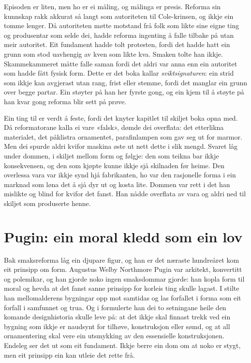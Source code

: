 Episoden er liten, men ho er ei måling, og målinga er presis. Reforma sin kunnskap rakk akkurat så langt som autoriteten til Cole-krinsen, og ikkje ein tomme lenger. Då autoriteten møtte motstand frå folk som likte sine eigne ting og produsentar som selde dei, hadde reforma ingenting å falle tilbake på utan meir autoritet. Eit fundament hadde tolt protesten, fordi det hadde hatt ein grunn som stod uavhengig av kven som likte kva. Smaken tolte han ikkje. Skammekammeret måtte falle saman fordi det aldri var anna enn ein autoritet som hadde fått fysisk form. Dette er det boka kallar \emph{sviktsignaturen}: ein strid som ikkje kan avgjerast utan rang, frist eller stemme, fordi det manglar ein grunn over begge partar. Ein støyter på han her fyrste gong, og ein kjem til å støyte på han kvar gong reforma blir sett på prøve.

Ein ting til er verdt å feste, fordi det knyter kapitlet til skiljet boka opna med. Då reformatorane kalla ei vare «falsk», dømde dei overflata: det etterlikna materialet, det påklistra ornamentet, parafinlampen som gav seg ut for marmor. Men dei spurde aldri kvifor maskina øste ut nett dette i slik mengd. Svaret låg under dommen, i skiljet mellom form og følgje: den som teikna bar ikkje konsekvensen, og den som kjøpte kunne ikkje sjå skilnaden før heime. Den overlessa vara var ikkje synd hjå fabrikanten, ho var den rasjonelle forma i ein marknad som løna det å sjå dyr ut og kosta lite. Dommen var rett i det han mislikte og blind for kvifor det fanst. Han nådde overflata av vara og aldri ned til skiljet som produserte henne.

\section{Pugin: ein moral kledd som ein lov}

Bak smaksreforma låg ein djupare figur, og han er det næraste hundreåret kom eit prinsipp om form. Augustus Welby Northmore Pugin var arkitekt, konvertitt og polemikar, og han gjorde noko ingen smaksdommar gjorde: han kopla form til moral og hevda at det fanst sanne prinsipp for korleis ting skulle lagast. I \textcite{pugin1836contrasts} stilte han mellomalderens bygningar opp mot samtidas og las forfallet i forma som eit forfall i samfunnet og trua. Og i \textcite{pugin1841true} formulerte han dei to setningane heile den komande designhistoria skulle leve på: at det ikkje skal finnast trekk ved ein bygning som ikkje er naudsynt for tilhøve, konstruksjon eller sømd, og at all ornamentering skal vere ein utsmykking av den essensielle konstruksjonen. Endeleg ser det ut som eit fundament. Ikkje berre ein dom om at noko er stygt, men eit prinsipp ein kan utleie det rette frå.


